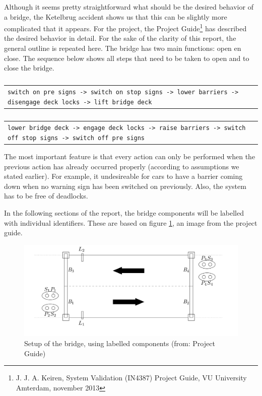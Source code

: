 Although it seems pretty straightforward what should be the desired behavior of a bridge, the Ketelbrug accident shows us that this can be slightly more complicated that it appears. For the project, the Project Guide\footnote{J. J. A. Keiren, System Validation (IN4387) Project Guide, VU University Amterdam, november 2013} has described the desired behavior in detail. For the sake of the clarity of this report, the general outline is repeated here. The bridge has two main functions: open en close. The sequence below shows all steps that need to be taken to open and to close the bridge.
%
\begin{table}[h]%
\begin{tabular}{l}
	\footnotesize
	\texttt{switch on pre signs -> switch on stop signs -> lower barriers -> disengage deck locks -> lift bridge deck}\\
\end{tabular}
\caption{}
\label{}
\end{table}
%
\begin{table}[h]%
\begin{tabular}{l}
	\footnotesize
	\texttt{lower bridge deck -> engage deck locks -> raise barriers -> switch off stop signs -> switch off pre signs}\\
\end{tabular}
\caption{}
\label{}
\end{table}
%
The most important feature is that every action can only be performed when the previous action has already occurred properly (according to assumptions we stated earlier). For example, it undesireable for cars to have a barrier coming down when no warning sign has been switched on previously. Also, the system has to be free of deadlocks. 

In the following sections of the report, the bridge components will be labelled with individual identifiers. These are based on figure \ref{fig:setup}, an image from the project guide. 
%
\begin{figure}[htb]%
\includegraphics[width=\columnwidth]{Images/Setup.png}%
\caption{Setup of the bridge, using labelled components (from: Project Guide)}%
\label{fig:setup}%
\end{figure}
%

\newpage